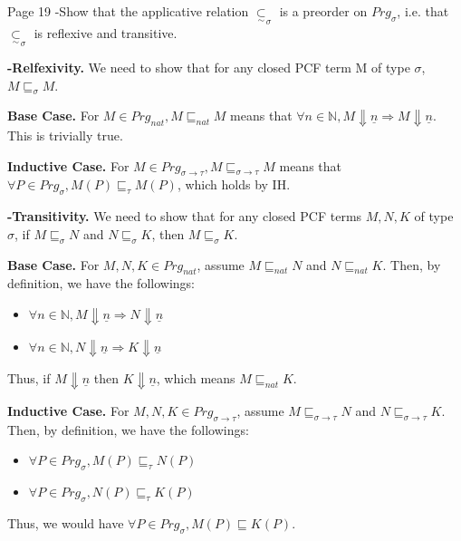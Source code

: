 \begin{problem}{Page 19}
    -Show that the applicative relation $ \underset{\sim}{\subset}_\sigma $ is a preorder on $Prg_\sigma$, i.e. that $ \underset{\sim}{\subset}_\sigma $ is reflexive and transitive.
\end{problem}

\begin{solution}
    
\textbf{-Relfexivity.}
We need to show that for any closed PCF term M of type $\sigma$, $M \sqsubseteq_\sigma M$.

\textbf{Base Case.} For $ M \in Prg_{nat}, M \sqsubseteq_{nat} M $ means that $\forall n \in \mathbb{N}, M \Downarrow \underline{n} \Rightarrow M \Downarrow \underline{n} $. This is trivially true.

\textbf{Inductive Case.} For $ M \in Prg_{\sigma \to \tau}, M \sqsubseteq_{\sigma \to \tau} M $ means that $ \forall P \in Prg_\sigma, M(P) \sqsubseteq_\tau M(P) $, which holds by IH.

\textbf{-Transitivity.} We need to show that for any closed PCF terms $ M, N, K $ of type $\sigma$, if $ M \sqsubseteq_\sigma N $ and $ N \sqsubseteq_\sigma K $, then $ M \sqsubseteq_\sigma K $.

\textbf{Base Case.} For $M, N, K \in Prg_{nat} $, assume $ M \sqsubseteq_{nat} N $ and $ N \sqsubseteq_{nat} K $. Then, by definition, we have the followings:

\begin{itemize}
    \item $ \forall n \in \mathbb{N}, M \Downarrow \underline{n} \Rightarrow N \Downarrow \underline{n} $
    \item $ \forall n \in \mathbb{N}, N \Downarrow \underline{n} \Rightarrow K \Downarrow \underline{n} $
\end{itemize}
Thus, if $ M \Downarrow \underline{n} $ then $ K \Downarrow \underline{n} $, which means $ M \sqsubseteq_{nat} K $.

\textbf{Inductive Case.} For $ M, N, K \in Prg_{\sigma \to \tau} $, assume $ M \sqsubseteq_{\sigma \to \tau} N $ and $ N \sqsubseteq_{\sigma \to \tau} K $. Then, by definition, we have the followings:

\begin{itemize}
    \item $ \forall P \in Prg_\sigma, M(P) \sqsubseteq_\tau N(P) $ 
    \item $ \forall P \in Prg_\sigma, N(P) \sqsubseteq_\tau K(P) $ 
\end{itemize}
Thus, we would have $ \forall P \in Prg_\sigma, M(P) \sqsubseteq K(P) $.
\end{solution}